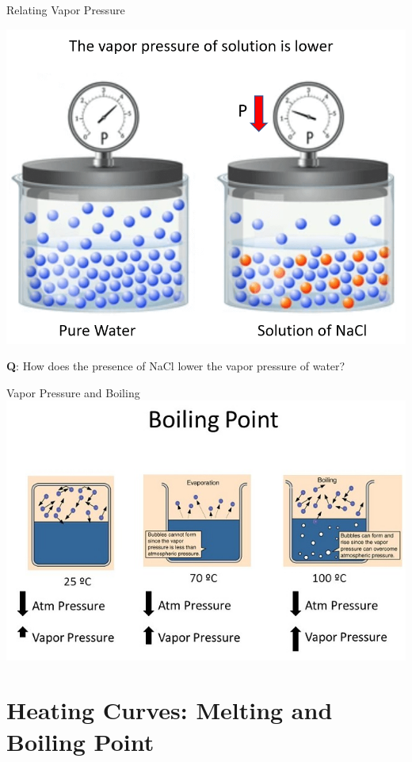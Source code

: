\documentclass[11pt]{beamer}
\begin{document}
\begin{frame}{Relating Vapor Pressure}
  \begin{center}
    \includegraphics[width=0.7\linewidth]{soln_vp}
  \end{center}
  \textbf{Q}: How does the presence of NaCl lower the vapor
  pressure of water?
\end{frame}

\begin{frame}{Vapor Pressure and Boiling}
  \centering
  \includegraphics[width=\linewidth,trim={0 0 0 1in},clip]{boiling_vapor}
\end{frame}

\section{Heating Curves: Melting and Boiling Point}
\end{document}

